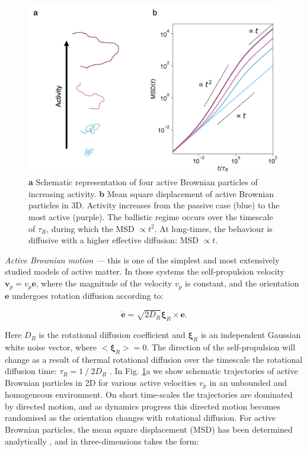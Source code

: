 \begin{figure}
	\includegraphics[width=\linewidth]{chapters/activeMatter/figsActiveMatter/fig3DabpMSD.png}
	\caption[Typical dynamics of active Brownian particles.]{\textbf{a} Schematic representation of four active Brownian particles of increasing activity. \textbf{b} Mean square displacement of active Brownian particles in 3D. Activity increases from the passive case (blue) to the most active (purple). The ballistic regime occurs over the timescale of $\tau_R$, during which the MSD $\propto t^2$. At long-times, the behaviour is diffusive with a higher effective diffusion: MSD $\propto t$.}
	\label{fig:ABP_example}
\end{figure}

\textit{Active Brownian motion --- } this is one of the simplest and most extensively studied models of active matter. In these systems the self-propulsion velocity $\mathbf{v}_p = v_p \mathbf{e}$, where the magnitude of the velocity $v_p$ is constant, and the orientation $\mathbf{e}$ undergoes rotation diffusion according to:


\begin{equation}
    \dot{\mathbf{e}}=\sqrt{2D_{R}}\boldsymbol{\xi}_{R} \times \mathbf{e}.
    \label{eq:ABP3D_e}
\end{equation}

\noindent Here $D_R$ is the rotational diffusion coefficient and $\boldsymbol{\xi}_{R}$ is an independent Gaussian white noise vector, where $<\boldsymbol{\xi}_R>=0$. 
The direction of the self-propulsion will change as a result of thermal rotational diffusion over the timescale the rotational diffusion time: $\tau_R = 1 \ / \ 2D_R$ \cite{wysocki2014}.
In Fig. \ref{fig:ABP_example}a we show schematic trajectories of active Brownian particles in 2D for various active velocities $v_p$ in an unbounded and homogeneous environment. On short time-scales the trajectories are dominated by directed motion, and as dynamics progress this directed motion becomes randomised as the orientation changes with rotational diffusion. For active Brownian particles, the mean square displacement (MSD) has been determined analytically \cite{howse2007}, and in three-dimensions takes the form:

